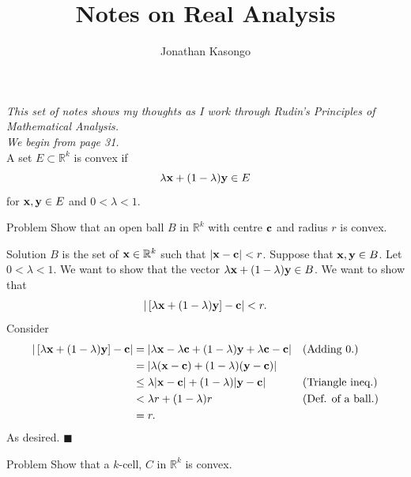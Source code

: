 \documentclass{article}
\author{Jonathan Kasongo}
\title{Notes on Real Analysis}
\begin{document}
\maketitle

\textit{This set of notes shows my thoughts as I work through Rudin's
Principles of Mathematical Analysis.}\\

\textit{We begin from page 31.}\\

A set $E \subset \mathbb{R}^k$ is convex if
$$
\lambda {\bf x} + (1-\lambda) {\bf y} \in E
$$
for ${\bf x, y} \in E$ and $0 < \lambda < 1$.\\

\begin{problem}{Problem}
Show that an open ball $B$ in $\mathbb{R}^k$ with centre $\bf c$ and
radius $r$ is convex.
\end{problem}

\begin{solution}{Solution}
$B$ is the set of ${\bf x} \in \mathbb{R}^k$ such that
$|{\bf x} - {\bf c}| < r$. Suppose that ${\bf x,y} \in B$. Let
$0 < \lambda < 1$. We want to show that the vector
$\lambda {\bf x} + (1-\lambda) {\bf y} \in B$. We want to show that
$$
| \left[ \lambda {\bf x} + (1-\lambda) {\bf y} \right] - {\bf c} | < r.
$$
Consider
\[
\begin{aligned}
| \left[ \lambda {\bf x} + (1-\lambda) {\bf y} \right] - {\bf c} | &=
| \lambda {\bf x} - \lambda {\bf c} + (1-\lambda) {\bf y} +
\lambda {\bf c} - {\bf c} | && \text{(Adding 0.)} \\
&= | \lambda ({\bf x} - {\bf c}) + (1-\lambda)({\bf y} - {\bf c}) | \\
&\leq \lambda |{\bf x} - {\bf c}| + (1-\lambda) |{\bf y} - {\bf c} |
&& \text{(Triangle ineq.)} \\
&< \lambda r + (1-\lambda) r && \text{(Def. of a ball.)} \\
&= r.
\end{aligned}
\]
As desired. $\blacksquare$
\end{solution}
\newpage

\begin{problem}{Problem}
Show that a $k$-cell, $C$ in $\mathbb{R}^k$ is convex.
\end{problem}
\end{document}
